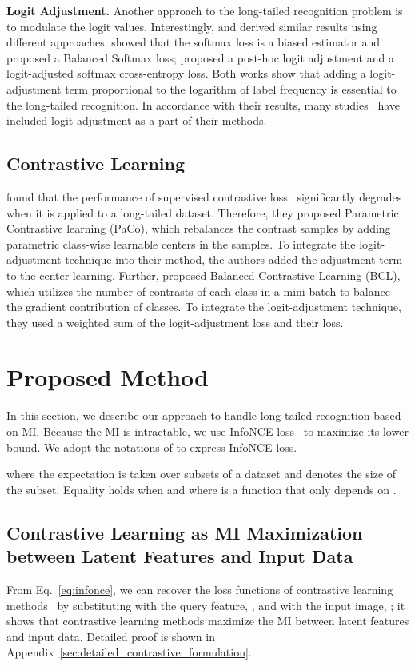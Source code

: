 \documentclass{article}
\theoremstyle{plain}
\theoremstyle{definition}
\theoremstyle{remark}
\begin{document}
\textbf{Logit Adjustment.} Another approach to the long-tailed recognition problem is to modulate the logit values. Interestingly, \citet{ren2020balanced} and \citet{menon2021long} derived similar results using different approaches. \citet{ren2020balanced} showed that the softmax loss is a biased estimator and proposed a Balanced Softmax loss; \citet{menon2021long} proposed a post-hoc logit adjustment and a logit-adjusted softmax cross-entropy loss. Both works show that adding a logit-adjustment term proportional to the logarithm of label frequency is essential to the long-tailed recognition. In accordance with their results, many studies~\cite{cui2021parametric,feng2021exploring,hong2021disentangling,zhu2022balanced} have included logit adjustment as a part of their methods.

\subsection{Contrastive Learning}
\citet{cui2021parametric} found that the performance of supervised contrastive loss~\cite{khosla2020supervised} significantly degrades when it is applied to a long-tailed dataset. Therefore, they proposed Parametric Contrastive learning (PaCo), which rebalances the contrast samples by adding parametric class-wise learnable centers in the samples. To integrate the logit-adjustment technique into their method, the authors added the adjustment term to the center learning. Further, \citet{zhu2022balanced} proposed Balanced Contrastive Learning (BCL), which utilizes the number of contrasts of each class in a mini-batch to balance the gradient contribution of classes. To integrate the logit-adjustment technique, they used a weighted sum of the logit-adjustment loss and their loss. \section{Proposed Method}
In this section, we describe our approach to handle long-tailed recognition based on MI. Because the MI is intractable, we use InfoNCE loss~\cite{oord2018representation} to maximize its lower bound. We adopt the notations of \citet{poole2019variational} to express InfoNCE loss.

where the expectation is taken over subsets of a dataset and  denotes the size of the subset. Equality holds when  and  where  is a function that only depends on .

\subsection{Contrastive Learning as MI Maximization between Latent Features and Input Data}
From Eq.~\ref{eq:infonce}, we can recover the loss functions of contrastive learning methods~\cite{chen2020big,he2020momentum} by substituting  with the query feature, , and  with the input image, ; it shows that contrastive learning methods maximize the MI between latent features and input data. Detailed proof is shown in Appendix~\ref{sec:detailed_contrastive_formulation}.
\end{document}

